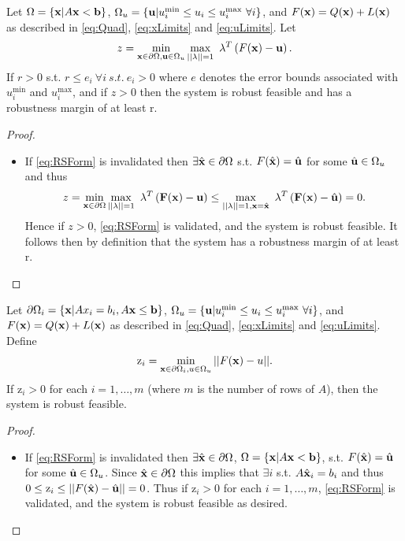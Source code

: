 
\begin{thm}
Let $\Omega=\{\bold x| A\bold x< \bold b\}$, $\Omega_{u}=\{\bold u| u^{\min}_i\leq u_i \leq u^{\max}_i \ \forall i \}$, and $F(\bold x)=Q(\bold x)+L(\bold x)$ as described in \eqref{eq:Quad}, \eqref{eq:xLimits} and \eqref{eq:uLimits}. 
Let
$$z = \min\limits_{\bold x\in \partial \Omega, \bold u\in \Omega_{u} }\max\limits_{||\bold{\lambda}||=1}\ \bold{\lambda}^T\left(F(\bold x)-\bold u\right).$$
If $r>0$ s.t. $r\leq e_i \ \forall i \ s.t. \ e_i>0$ where $e$ denotes the error bounds associated with $ u^{\min}_i$ and $ u^{\max}_i$, and if $z>0$ then the system is robust feasible and has a robustness margin of at least r.

\begin{proof} \ \\
\begin{itemize}
\item[] If \eqref{eq:RSForm} is invalidated then $\exists \hat{\bold x}\in\partial\Omega$ s.t. $F(\hat{\bold x})=\hat{\bold u}$ for some $\hat{\bold u}\in\Omega_{u}$ and thus $$z = \min\limits_{\bold x\in \partial \Omega}\max\limits_{||\bold{\lambda}||=1}\ \bold{\lambda}^T\left(\bold{F}(\bold x)-\bold u\right)\leq \max\limits_{||\bold{\lambda}||=1, \bold x=\hat{\bold x}}\ \bold{\lambda}^T\left(\bold{F}(\bold x)-\hat{\bold u}\right)=0.$$ 
Hence if $z>0$, \eqref{eq:RSForm} is validated, and the system is robust feasible. It follows then by definition that the system has a robustness margin of at least r.
\end{itemize}
\end{proof}
\end{thm}

\begin{thm} \label{thm:RobFeas}
Let $\partial\Omega_i=\{\bold x| Ax_i = b_i, A\bold x\leq \bold b\}$, $\Omega_{u}=\{\bold u| u^{\min}_i\leq u_i \leq u^{\max}_i \ \forall i \}$, and $F(\bold x)=Q(\bold x)+L(\bold x)$ as described in \eqref{eq:Quad}, \eqref{eq:xLimits} and \eqref{eq:uLimits}. Define
\begin{align}
\mathrm{z}_i =  \min_{\bold x\in\partial\Omega_i, u\in \Omega_u} ||F(\bold x)-u||. \label{eq:OPTfeas}
\end{align}
If $\mathrm{z}_i>0$ for each $i = 1, \ldots, m$ (where $m$ is the number of rows of $A$), then the system is robust feasible.

\begin{proof} \ \\
\begin{itemize}
\item[] If \eqref{eq:RSForm} is invalidated then $\exists \hat{\bold x}\in\partial\Omega$, $\Omega=\{\bold x| A\bold x< \bold b\}$, s.t. $F(\hat{\bold x})=\hat{\bold u}$ for some $\hat{\bold u}\in \Omega_u$. 
Since $\hat{\bold x}\in\partial\Omega$ this implies that $\exists i$ s.t. $A\hat{\bold x}_i=b_i$ and thus $0\leq \mathrm{z}_i \leq ||F(\hat{\bold x})-\hat{\bold u}||=0$.
Thus if $\mathrm{z}_i>0$ for each $i = 1, \ldots, m$, \eqref{eq:RSForm} is validated, and the system is robust feasible as desired.
\end{itemize}
\end{proof}
\end{thm}

